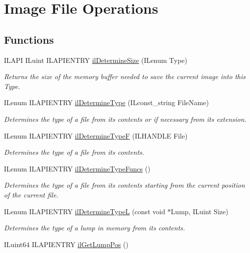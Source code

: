 \hypertarget{group__file}{\section{Image File Operations}
\label{group__file}
}
\subsection*{Functions}
\begin{DoxyCompactItemize}
\item 
I\+L\+A\+P\+I I\+Luint I\+L\+A\+P\+I\+E\+N\+T\+R\+Y \hyperlink{group__file_ga1a1701a1dbec445a4e184a189707d2cd}{il\+Determine\+Size} (I\+Lenum Type)
\begin{DoxyCompactList}\small\item\em Returns the size of the memory buffer needed to save the current image into this Type. \end{DoxyCompactList}\item 
I\+Lenum I\+L\+A\+P\+I\+E\+N\+T\+R\+Y \hyperlink{group__file_ga910c033593bbdb2d6018ecbe2aeab089}{il\+Determine\+Type} (I\+Lconst\+\_\+string File\+Name)
\begin{DoxyCompactList}\small\item\em Determines the type of a file from its contents or if necessary from its extension. \end{DoxyCompactList}\item 
I\+Lenum I\+L\+A\+P\+I\+E\+N\+T\+R\+Y \hyperlink{group__file_gad4fad086e3c82e04e022254f8e4b8492}{il\+Determine\+Type\+F} (I\+L\+H\+A\+N\+D\+L\+E File)
\begin{DoxyCompactList}\small\item\em Determines the type of a file from its contents. \end{DoxyCompactList}\item 
I\+Lenum I\+L\+A\+P\+I\+E\+N\+T\+R\+Y \hyperlink{group__file_ga4b9f6b7a5c4a97a916efa67d2ce64546}{il\+Determine\+Type\+Funcs} ()
\begin{DoxyCompactList}\small\item\em Determines the type of a file from its contents starting from the current position of the current file. \end{DoxyCompactList}\item 
I\+Lenum I\+L\+A\+P\+I\+E\+N\+T\+R\+Y \hyperlink{group__file_ga706207244bcf99e76f299c5e43800300}{il\+Determine\+Type\+L} (const void $\ast$Lump, I\+Luint Size)
\begin{DoxyCompactList}\small\item\em Determines the type of a lump in memory from its contents. \end{DoxyCompactList}\item 
\hypertarget{group__file_gad3dba757768898d1833540d6c7a3686b}{I\+Luint64 I\+L\+A\+P\+I\+E\+N\+T\+R\+Y \hyperlink{group__file_gad3dba757768898d1833540d6c7a3686b}{il\+Get\+Lump\+Pos} ()}\label{group__file_gad3dba757768898d1833540d6c7a3686b}


\end{DoxyCompactItemize}
